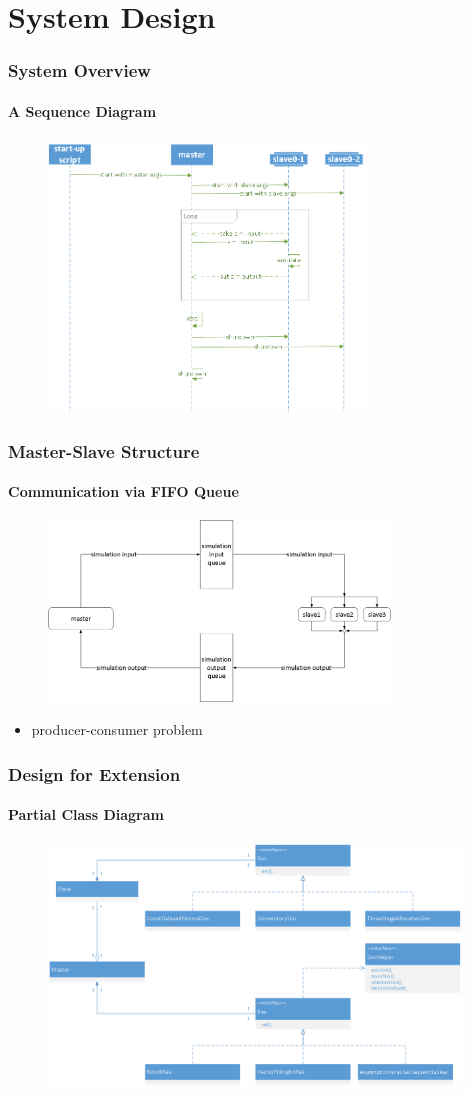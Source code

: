 \documentclass{beamer}
\begin{document}
\section{System Design}

\begin{frame}
\frametitle{System Overview}
\framesubtitle{A Sequence Diagram}
\begin{figure}[ht]
\centering
\includegraphics[height=72mm]{overview_seq_single.png}
\end{figure}
\end{frame}

\begin{frame}
\frametitle{Master-Slave Structure}
\framesubtitle{Communication via FIFO Queue}
\begin{figure}[ht]
\centering
\includegraphics[height=48mm]{master-slave-queue.png}
\end{figure}
\begin{itemize}
\item producer-consumer problem
\end{itemize}
\end{frame}

\begin{frame}
\frametitle{Design for Extension}
\framesubtitle{Partial Class Diagram}
\begin{figure}[ht]
\centering
\includegraphics[height=64mm]{ras-sim-class.png}
\end{figure}
\end{frame}
\end{document}
